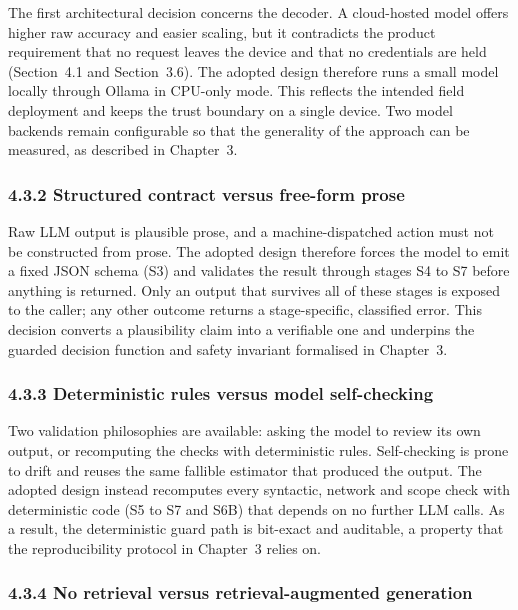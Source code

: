 \documentclass[
]{article}
\begin{document}
The first architectural decision concerns the decoder. A cloud-hosted
model offers higher raw accuracy and easier scaling, but it contradicts
the product requirement that no request leaves the device and that no
credentials are held (Section~4.1 and Section~3.6). The adopted design
therefore runs a small model locally through Ollama in CPU-only mode.
This reflects the intended field deployment and keeps the trust boundary
on a single device. Two model backends remain configurable so that the
generality of the approach can be measured, as described in Chapter~3.

\hypertarget{structured-contract-versus-free-form-prose}{%
\subsubsection{4.3.2 Structured contract versus free-form
prose}\label{structured-contract-versus-free-form-prose}}

Raw LLM output is plausible prose, and a machine-dispatched action must
not be constructed from prose. The adopted design therefore forces the
model to emit a fixed JSON schema (S3) and validates the result through
stages S4 to S7 before anything is returned. Only an output that
survives all of these stages is exposed to the caller; any other outcome
returns a stage-specific, classified error. This decision converts a
plausibility claim into a verifiable one and underpins the guarded
decision function and safety invariant formalised in Chapter~3.

\hypertarget{deterministic-rules-versus-model-self-checking}{%
\subsubsection{4.3.3 Deterministic rules versus model
self-checking}\label{deterministic-rules-versus-model-self-checking}}

Two validation philosophies are available: asking the model to review
its own output, or recomputing the checks with deterministic rules.
Self-checking is prone to drift and reuses the same fallible estimator
that produced the output. The adopted design instead recomputes every
syntactic, network and scope check with deterministic code (S5 to S7 and
S6B) that depends on no further LLM calls. As a result, the
deterministic guard path is bit-exact and auditable, a property that the
reproducibility protocol in Chapter~3 relies on.

\hypertarget{no-retrieval-versus-retrieval-augmented-generation}{%
\subsubsection{4.3.4 No retrieval versus retrieval-augmented
generation}\label{no-retrieval-versus-retrieval-augmented-generation}}
\end{document}
